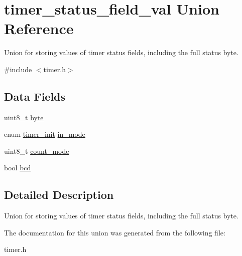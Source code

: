 \hypertarget{uniontimer__status__field__val}{}\section{timer\+\_\+status\+\_\+field\+\_\+val Union Reference}
\label{uniontimer__status__field__val}


Union for storing values of timer status fields, including the full status byte.  




{\ttfamily \#include $<$timer.\+h$>$}

\subsection*{Data Fields}
\begin{DoxyCompactItemize}
\item 
uint8\+\_\+t \hyperlink{group__timer_ga96f44d20f1dbf1c8785a7bc99a46164c}{byte}
\item 
enum \hyperlink{group__timer_ga5cc20f14fd50625eea9b20f58fbe2a55}{timer\+\_\+init} \hyperlink{group__timer_gad414fb8742e435f9bda1f199a6200645}{in\+\_\+mode}
\item 
uint8\+\_\+t \hyperlink{group__timer_gabd6e94a182fc2daff67dfb46f732644a}{count\+\_\+mode}
\item 
bool \hyperlink{group__timer_gaa2444cde256beeae6fb06bb7a5ebd0c9}{bcd}
\end{DoxyCompactItemize}


\subsection{Detailed Description}
Union for storing values of timer status fields, including the full status byte. 

The documentation for this union was generated from the following file\+:\begin{DoxyCompactItemize}
\item 
timer.\+h\end{DoxyCompactItemize}
